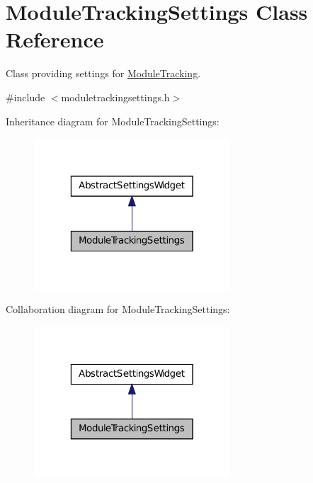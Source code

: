 \hypertarget{class_module_tracking_settings}{
\section{ModuleTrackingSettings Class Reference}
\label{db/d02/class_module_tracking_settings}
}


Class providing settings for \hyperlink{class_module_tracking}{ModuleTracking}.  




{\ttfamily \#include $<$moduletrackingsettings.h$>$}



Inheritance diagram for ModuleTrackingSettings:\nopagebreak
\begin{figure}[H]
\begin{center}
\leavevmode
\includegraphics[width=208pt]{dd/d3f/class_module_tracking_settings__inherit__graph}
\end{center}
\end{figure}


Collaboration diagram for ModuleTrackingSettings:\nopagebreak
\begin{figure}[H]
\begin{center}
\leavevmode
\includegraphics[width=208pt]{d5/d9d/class_module_tracking_settings__coll__graph}
\end{center}
\end{figure}

